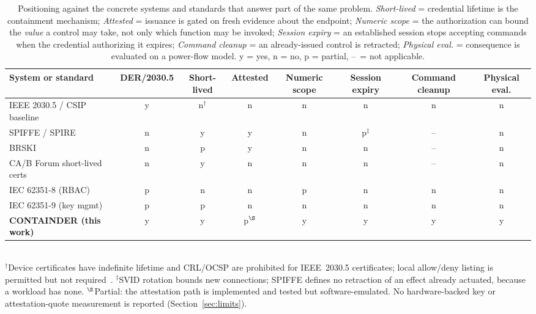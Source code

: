 \begin{table}[t]
\centering
\caption{Positioning against the concrete systems and standards that answer part of the same
problem. \emph{Short-lived} = credential lifetime is the containment mechanism; \emph{Attested} =
issuance is gated on fresh evidence about the endpoint; \emph{Numeric scope} = the authorization
can bound the \emph{value} a control may take, not only which function may be invoked;
\emph{Session expiry} = an established session stops accepting commands when the credential
authorizing it expires; \emph{Command cleanup} = an already-issued control is retracted;
\emph{Physical eval.} = consequence is evaluated on a power-flow model.
y = yes, n = no, p = partial, --~= not applicable.}
\label{tab:relatedcmp}
\footnotesize
\begin{tabular}{@{}p{}ccccccc@{}}
\toprule
System or standard & DER/2030.5 & Short-lived & Attested & Numeric scope & Session expiry &
Command cleanup & Physical eval. \\
\midrule
IEEE 2030.5 / CSIP baseline~\cite{ieee20305-2018,sunspec2018csip} & y & n$^{\dagger}$ & n & n & n & n & n \\
SPIFFE / SPIRE~\cite{spiffe-spec,spiffe-cncf} & n & y & y & n & p$^{\ddagger}$ & -- & n \\
BRSKI~\cite{rfc8995} & n & p & y & n & n & -- & n \\
CA/B Forum short-lived certs~\cite{cabf-sc063v4,cabf-br} & n & y & n & n & n & -- & n \\
IEC 62351-8 (RBAC)~\cite{iec62351-8} & p & n & n & p & n & n & n \\
IEC 62351-9 (key mgmt)~\cite{iec62351-9} & p & p & n & n & n & n & n \\
\textbf{CONTAINDER (this work)} & y & y & p$^{\S}$ & y & y & y & y \\
\bottomrule
\end{tabular}
\\[2pt]
{\footnotesize
$^{\dagger}$Device certificates have indefinite lifetime and CRL/OCSP are prohibited for
IEEE~2030.5 certificates; local allow/deny listing is permitted but not
required~\cite{obert2019recommendations}.
$^{\ddagger}$SVID rotation bounds new connections; SPIFFE defines no retraction of an effect
already actuated, because a workload has none.
$^{\S}$Partial: the attestation path is implemented and tested but software-emulated. No
hardware-backed key or attestation-quote measurement is reported (Section~\ref{sec:limits}).}
\end{table}
